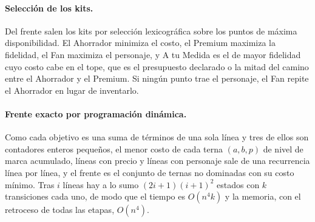 \paragraph{Selección de los kits.}
Del frente salen los kits por selección lexicográfica sobre los puntos de máxima disponibilidad. El
Ahorrador minimiza el costo, el Premium maximiza la fidelidad, el Fan maximiza el personaje, y A tu
Medida es el de mayor fidelidad cuyo costo cabe en el tope, que es el presupuesto declarado o la
mitad del camino entre el Ahorrador y el Premium. Si ningún punto trae el personaje, el Fan repite el
Ahorrador en lugar de inventarlo.

\begin{algorithm}[H]
\caption{Selección lexicográfica de los kits sobre el frente.}
\label{alg:anexo-proyectar}
\small
{}
\end{algorithm}

\paragraph{Frente exacto por programación dinámica.}
Como cada objetivo es una suma de términos de una sola línea y tres de ellos son contadores enteros
pequeños, el menor costo de cada terna $(a, b, p)$ de nivel de marca acumulado, líneas con precio y
líneas con personaje sale de una recurrencia línea por línea, y el frente es el conjunto de ternas no
dominadas con su costo mínimo. Tras $i$ líneas hay a lo sumo $(2i+1)(i+1)^2$ estados con $k$
transiciones cada uno, de modo que el tiempo es $O(n^4k)$ y la memoria, con el retroceso de todas las
etapas, $O(n^4)$.

